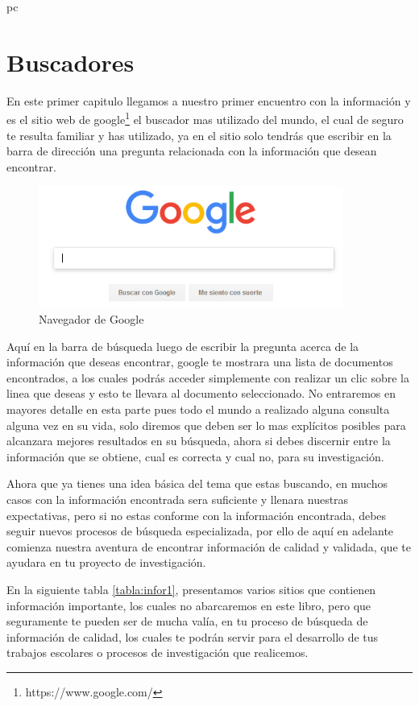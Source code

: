 pc\documentclass[a4paper,12pt,openany]{book}
\begin{document}
\chapter{Buscadores}
En este primer capitulo llegamos a nuestro primer encuentro con la información y es el sitio web de google\footnote{https://www.google.com/} el buscador mas utilizado del mundo, el cual de seguro te resulta familiar y has utilizado, ya en el sitio solo tendrás que escribir en la barra de dirección una pregunta relacionada con la información que desean encontrar. 

\begin{figure}[ht]
  \centering
	\includegraphics[width=10cm]{google1.png}
\caption{Navegador de Google}
  \label{fig:google1}
\end{figure}

Aquí en la barra de búsqueda luego de escribir la pregunta acerca de la información que deseas encontrar, google te mostrara una lista de documentos encontrados, a los cuales podrás acceder simplemente con realizar un clic sobre la linea que deseas y esto te llevara al documento seleccionado. No  entraremos en mayores detalle en esta parte pues todo el mundo a realizado alguna consulta alguna vez en su vida, solo diremos que deben ser lo mas explícitos posibles para alcanzara mejores resultados en su búsqueda, ahora si debes discernir entre la información que se obtiene, cual es  correcta y cual no, para su investigación.

Ahora que ya tienes una idea básica del tema que estas buscando, en muchos casos con la información encontrada sera suficiente y llenara nuestras expectativas, pero si no estas conforme con la información encontrada, debes seguir nuevos procesos de búsqueda especializada, por ello de aquí en adelante comienza nuestra aventura de encontrar información de calidad y validada, que te ayudara en tu proyecto de investigación.

En la siguiente tabla \ref{tabla:infor1}, presentamos varios sitios que contienen información importante, los cuales no abarcaremos en este libro, pero que seguramente te pueden ser de mucha valía, en tu proceso de búsqueda de información de calidad, los cuales te podrán servir para el desarrollo de tus trabajos escolares o procesos de investigación que realicemos.
\end{document}
